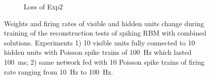 \begin{figure}
\begin{subfigure}[t]{0.48\textwidth}
		\caption{Loss of Exp2}
	\end{subfigure}
	\caption[SRBM-S4 training of the reconstruction tests.]{Weights and firing rates of visible and hidden units change during training of the reconstruction tests of spiking RBM with combined solutions. 
		Experiments 1) 10 visible units fully connected to 10 hidden units with Poisson spike trains of 100~Hz which lasted 100~ms; 2) same network fed with 10 Poisson spike trains of firing rate ranging from 10~Hz to 100~Hz.}
	\label{fig:sol4_rbm}
\end{figure}

%
\begin{figure}
	\centering
	\begin{subfigure}[c]{0.48\textwidth}\raggedleft
		\\
		\\

\end{subfigure}
\end{figure}
